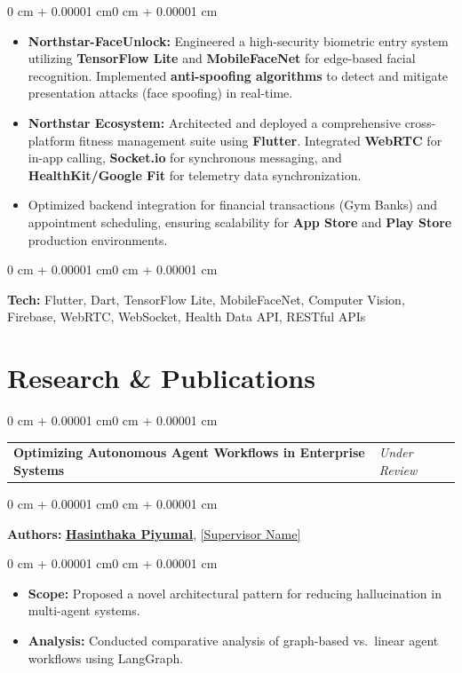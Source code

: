 \documentclass[10pt, letterpaper]{article}
\makeatletter
\newenvironment{highlights}{
    \begin{itemize}[
        topsep=0.10 cm,
        parsep=0.10 cm,
        partopsep=0pt,
        itemsep=0pt,
        leftmargin=0 cm + 10pt
    ]
}{
    \end{itemize}
}
\newenvironment{onecolentry}{
    \begin{adjustwidth}{0 cm + 0.00001 cm}{0 cm + 0.00001 cm}
}{
    \end{adjustwidth}
}
\newenvironment{twocolentry}{
    \begin{onecolentry}
    \begin{tabular}{@{}p{\dimexpr\textwidth-4.5cm\relax}>{\raggedleft\arraybackslash}p{4.5cm}@{}}
}{
    \end{tabular}
    \end{onecolentry}
}
\newcommand{\twocolitem}[2]{#1 & \textit{#2} \\}
\let\hrefWithoutArrow\href
\makeatother
\begin{document}
\vspace{0.08 cm}
\begin{onecolentry}
    \begin{highlights}
        \item \textbf{Northstar-FaceUnlock:} Engineered a high-security biometric entry system utilizing \textbf{TensorFlow Lite} and \textbf{MobileFaceNet} for edge-based facial recognition. Implemented \textbf{anti-spoofing algorithms} to detect and mitigate presentation attacks (face spoofing) in real-time.
        \item \textbf{Northstar Ecosystem:} Architected and deployed a comprehensive cross-platform fitness management suite using \textbf{Flutter}. Integrated \textbf{WebRTC} for in-app calling, \textbf{Socket.io} for synchronous messaging, and \textbf{HealthKit/Google Fit} for telemetry data synchronization.
        \item Optimized backend integration for financial transactions (Gym Banks) and appointment scheduling, ensuring scalability for \textbf{App Store} and \textbf{Play Store} production environments.
    \end{highlights}
\end{onecolentry}

\vspace{0.08 cm}
\begin{onecolentry}
\textbf{Tech:} Flutter, Dart, TensorFlow Lite, MobileFaceNet, Computer Vision, Firebase, WebRTC, WebSocket, Health Data API, RESTful APIs
\end{onecolentry}

\section{Research \& Publications}

\begin{twocolentry}
\twocolitem{\textbf{Optimizing Autonomous Agent Workflows in Enterprise Systems}}{Under Review}
\end{twocolentry}

\vspace{0.08 cm}
\begin{onecolentry}
\textbf{Authors:} \hrefWithoutArrow{https://linkedin.com/in/hasinthaka-piyumal}{\textbf{Hasinthaka Piyumal}}, \hrefWithoutArrow{https://scholar.google.com}{[Supervisor Name]}
\end{onecolentry}

\vspace{0.08 cm}
\begin{onecolentry}
    \begin{highlights}
        \item \textbf{Scope:} Proposed a novel architectural pattern for reducing hallucination in multi-agent systems.
        \item \textbf{Analysis:} Conducted comparative analysis of graph-based vs.\ linear agent workflows using LangGraph.
    \end{highlights}
\end{onecolentry}
\end{document}
